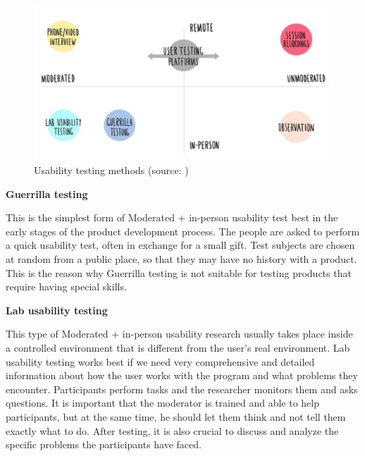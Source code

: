 \documentclass[a4paper,10pt,twoside]{article}
\begin{document}
\vspace{0.3cm}
\begin{figure}[hbt!] 
\begin{center}
\includegraphics[width=13cm]{../pictures/usability_testing_methods.png} 
\caption[Usability testing methods]{Usability testing methods (source: \cite{hotjar})}
\label{fig:usability_testing_methods}
\end{center}
\end{figure}

\noindent \textbf {Guerrilla testing}

\noindent This is the simplest form of Moderated + in-person usability test best in the early stages of the product development process. The people are asked to perform a quick usability test, often in exchange for a small gift. Test subjects are chosen at random from a public place, so that they may have no history with a product. This is the reason why Guerrilla testing is not suitable for testing products that require having special skills.

\smallskip

\noindent \textbf {Lab usability testing}

\noindent This type of Moderated + in-person usability research usually takes place inside a controlled environment that is different from the user’s real environment. Lab usability testing works best if we need very comprehensive and detailed information about how the user works with the program and what problems they encounter. Participants perform tasks and the researcher monitors them and asks questions. It is important that the moderator is trained and able to help participants, but at the same time, he should let them think and not tell them exactly what to do. After testing, it is also crucial to discuss and analyze the specific problems the participants have faced.

\smallskip
\end{document}
